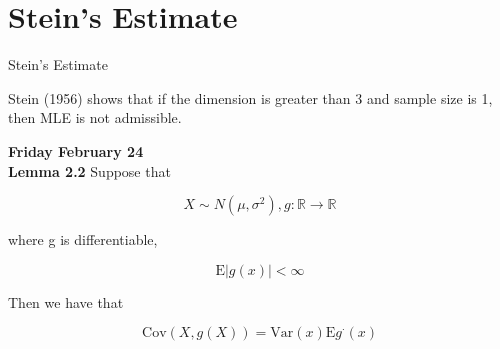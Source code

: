 \documentclass[11pt,fleqn]{book} %
\newcommand{\E}{\mathrm{E}}
\newcommand{\Var}{\mathrm{Var}}
\newcommand{\Cov}{\mathrm{Cov}}
\begin{document}
\section{Stein's Estimate}{Stein's Estimate}

Stein (1956) shows that if the dimension is greater than 3 and sample size is 1, then MLE is not admissible. 

\textbf{Friday February 24}\\

\textbf{Lemma 2.2} Suppose that 
		
		$$X \sim N(\mu, \sigma^2), g:\mathbb{R} \rightarrow \mathbb{R} $$

where g is differentiable, 

		$$\E |g(x)| < \infty $$

Then we have that

		$$\Cov (X, g(X)) = \Var (x) \E g^\cdot(x) $$
\end{document}
